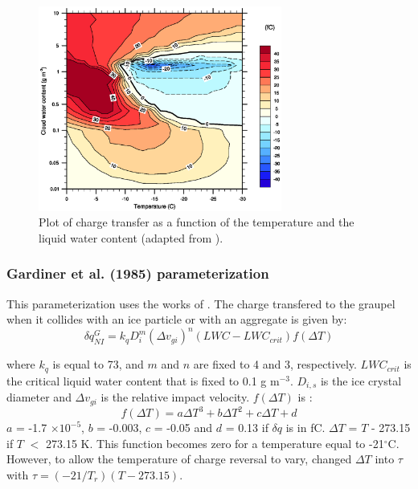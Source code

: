 \begin{figure}[h]
  \begin{center}
    \includegraphics[width=8cm]{./EPS/fig_takahashi.eps}
  \end{center}
  \caption{\small Plot of charge transfer as a function of the temperature and the liquid water content (adapted from \citet{Takahashi-1978}).}
  \label{fig:takahashi}
\end{figure}

\subsubsection{Gardiner et al. (1985) parameterization}

This parameterization uses the works of \citet{Jayaratne-1983}.
The charge transfered to the graupel when it collides with an ice particle or with an aggregate is given by:
\begin{equation}
  \delta q_{NI} ^G = k_q D_i ^m (\Delta v_{gi} )^n (LWC - LWC_{crit}) 
                     f(\Delta T)
\label{eq:gardiner}
\end{equation}

\noindent
where $k_q$ is equal to 73, and $m$ and $n$ are fixed to 4 and 3, respectively.
$LWC_{crit}$ is the critical liquid water content that is fixed to 0.1 g m$^{-3}$.
$D_{i,s}$ is the ice crystal diameter and $\Delta v_{gi}$ is the relative impact velocity.
$f(\Delta T)$ is :
\begin{equation}
  f(\Delta T) = a \Delta T^3 + b \Delta T^2 + c \Delta T + d
\end{equation}
$a$ = -1.7 $\times 10^{-5}$, $b$ = -0.003, $c$ = -0.05 and $d$ = 0.13 if $\delta q$ is in fC.
$\Delta$$T$ = $T$ - 273.15 if $T$ $<$ 273.15 K.
This function becomes zero for a temperature equal to -21$^{\circ}$C.
However, to allow the temperature of charge reversal to vary, \citet{Ziegler-1991} changed $\Delta T$ into $\tau$ with $\tau = (-21 / T_r)(T-273.15)$.\\

